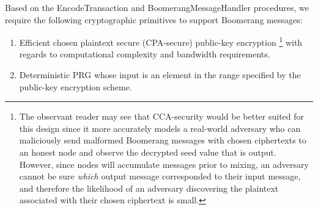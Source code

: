 Based on the {\sf EncodeTransaction} and {\sf BoomerangMessageHandler} procedures, we require the following cryptographic primitives to support Boomerang messages:
\begin{enumerate}
	\item Efficient chosen plaintext secure (CPA-secure) public-key encryption \footnote{The observant reader may see that CCA-security would be better suited for this design since it more accurately models a real-world adversary who can maliciously send malformed Boomerang messages with chosen ciphertexts to an honest node and observe the decrypted seed value that is output. However, since nodes will accumulate messages prior to mixing, an adversary cannot be sure \emph{which} output message corresponded to their input message, and therefore the likelihood of an adversary discovering the plaintext associated with their chosen ciphertext is small.} with regards to computational complexity and bandwidth requirements. 
	\item Deterministic PRG whose input is an element in the range specified by the public-key encryption scheme.
\end{enumerate}

